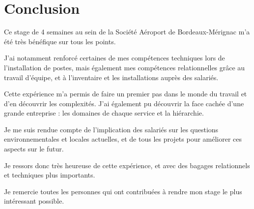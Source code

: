 \chapter{Conclusion}


Ce stage de 4 semaines au sein de la Société Aéroport de Bordeaux-Mérignac m’a été très bénéfique sur tous les points.

J’ai notamment renforcé certaines de mes compétences techniques lors de l’installation de postes, mais également mes compétences relationnelles grâce au travail d’équipe, et à l’inventaire et les installations auprès des salariés.

Cette expérience m’a permis de faire un premier pas dans le monde du travail et d’en découvrir les complexités. J’ai également pu découvrir la face cachée d’une grande entreprise : les domaines de chaque service et la hiérarchie.

Je me suis rendue compte de l’implication des salariés sur les questions environnementales et locales actuelles, et de tous les projets pour améliorer ces aspects sur le futur.

Je ressors donc très heureuse de cette expérience, et avec des bagages relationnels et techniques plus importants.

Je remercie toutes les personnes qui ont contribuées à rendre mon stage le plus intéressant possible.